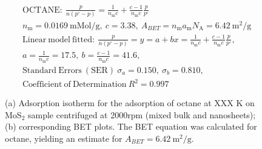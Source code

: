 

\begin{align*}
&\mathrm{OCTANE:}\ \frac{p}{n(p^\circ-p)}=\frac{1}{n_\mathrm{m}c}+\frac{c-1}{n_\mathrm{m}c}\frac{p}{p^\circ}\\
&{n_\mathrm{m}}=0.0169\ \mathrm{mMol/g},\ c=3.38,\ A_{BET}={n_\mathrm{m}}{a_\mathrm{m}}{N_\mathrm{A}}=6.42\ \mathrm{m}^2\mathrm{/g}\\
&\mathrm{Linear\ model\ fitted:}\ \frac{p}{n(p^\circ-p)}=y=a+bx=\frac{1}{n_\mathrm{m}c}+\frac{c-1}{n_\mathrm{m}c}\frac{p}{p^\circ},\\
&a=\frac{1}{n_\mathrm{m}c}=17.5,\ b=\frac{c-1}{n_\mathrm{m}c}=41.6,\\
&\mathrm{Standard\ Errors\ (SER)}\ \sigma_a=0.150,\ \sigma_b=0.810,\\
&\mathrm{Coefficient\ of\ Determination}\ R^2 = 0.997
\end{align*}


\begin{figure}[htb]
\hfill
{}
\caption{(a) Adsorption isotherm for the adsorption of octane at XXX K on MoS$_2$ 
sample centrifuged at 2000rpm (mixed bulk and nanosheets);
(b) corresponding BET plots. The BET equation was calculated for octane, yielding an estimate for $A_{BET}=6.42\ \mathrm{m}^2\mathrm{/g}$.}

\label{fig:sa-Reference-As-Supplied-100mg-3mm-30C-S1-SA-10ml}
\end{figure}


